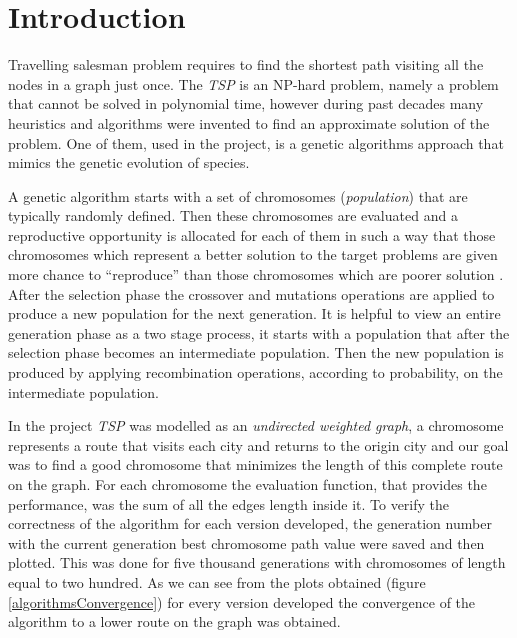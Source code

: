 \section{Introduction}

Travelling salesman problem requires to find the shortest path visiting all the nodes in a graph just once. The \textit{TSP} is an NP-hard problem, namely a problem that cannot be solved in polynomial time, however during past decades many heuristics and algorithms were invented to find an approximate solution of the problem. One of them, used in the project, is a genetic algorithms approach that mimics the genetic evolution of species. 

A genetic algorithm starts with a set of chromosomes (\textit{population}) that are typically randomly defined. Then these chromosomes are evaluated and a reproductive opportunity is allocated for each of them in such a way that those chromosomes which represent a better solution to the target problems are given more chance to ``reproduce'' than those chromosomes which are poorer solution \cite{genetic-algorithm-tutorial}. After the selection phase the crossover and mutations operations are applied to produce a new population for the next generation. It is helpful to view an entire generation phase as a two stage process, it starts with a population that after the selection phase becomes an intermediate population. Then the new population is produced by applying recombination operations, according to probability, on the intermediate population. 

In the project \textit{TSP} was modelled as an \textit{undirected weighted graph}, a chromosome represents a route that visits each city and returns to the origin city and our goal was to find a good chromosome that minimizes the length of this complete route on the graph. For each chromosome the evaluation function, that provides the performance, was the sum of all the edges length inside it. To verify the correctness of the algorithm for each version developed, the generation number with the current generation best chromosome path value were saved and then plotted. This was done for five thousand generations with chromosomes of length equal to two hundred. As we can see from the plots obtained (figure  \ref{algorithmsConvergence}) for every version developed the convergence of the algorithm to a lower route on the graph was obtained. 
\vspace{0.6em}

